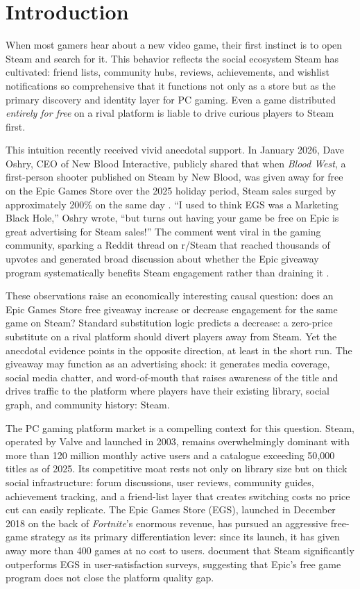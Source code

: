 \documentclass[11pt]{article}
\begin{document}
\section{Introduction}

When most gamers hear about a new video game, their first instinct is to open Steam and search for it.
This behavior reflects the social ecosystem Steam has cultivated: friend
lists, community hubs, reviews, achievements, and wishlist notifications so comprehensive
that it functions not only as a store but as the primary discovery and identity layer
for PC gaming. Even a game distributed \textit{entirely for free} on a rival platform is liable
to drive curious players to Steam first.

This intuition recently received vivid anecdotal support. In January 2026, Dave Oshry,
CEO of New Blood Interactive, publicly shared that when \textit{Blood West}, a 
first-person shooter published on Steam by New Blood, was given away for
free on the Epic Games Store over the 2025 holiday period, Steam sales surged by
approximately 200\% on the same day \citep{frvr2026}. ``I used to think EGS was a
Marketing Black Hole,'' Oshry wrote, ``but turns out having your game be free on Epic is
great advertising for Steam sales!'' The comment went viral in the gaming community,
sparking a Reddit thread on r/Steam that reached thousands of upvotes and generated
broad discussion about whether the Epic giveaway program systematically benefits Steam
engagement rather than draining it \citep{reddit2026}.

These observations raise an economically interesting causal question: does an
Epic Games Store free giveaway increase or decrease engagement for
the same game on Steam? Standard substitution logic predicts a decrease: a zero-price
substitute on a rival platform should divert players away from Steam. Yet the anecdotal
evidence points in the opposite direction, at least in the short run. The giveaway
may function as an advertising shock: it generates media coverage, social media chatter,
and word-of-mouth that raises awareness of the title and drives traffic to the platform
where players have their existing library, social graph, and community history: Steam.

The PC gaming platform market is a compelling context for this question. Steam,
operated by Valve and launched in 2003, remains overwhelmingly dominant with more than
120 million monthly active users and a catalogue exceeding 50{,}000 titles as of 2025.
Its competitive moat rests not only on library size but on thick social infrastructure:
forum discussions, user reviews, community guides, achievement tracking, and a friend-list
layer that creates switching costs no price cut can easily replicate. The Epic Games
Store (EGS), launched in December 2018 on the back of \textit{Fortnite}'s enormous
revenue, has pursued an aggressive free-game strategy as its primary differentiation
lever: since its launch, it has given away more than 400 games at no cost to users.
\citet{nabil2025} document that Steam significantly outperforms EGS in user-satisfaction surveys, 
suggesting that Epic's free game program does not close the platform quality gap.
\end{document}
